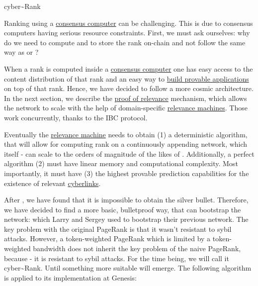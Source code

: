 \documentclass[8pt,oneside]{amsart}
\makeatletter
\newcommand{\linkred}[2]{\href{#1}{\color{red}{#2}}}
\newcommand{\linkgreen}[2]{\href{#1}{\color{green}{#2}}}
\renewcommand\subsection{\@startsection{subsection}
                                    {2}{\z@}
                                    {-3.25ex\@plus -1ex \@minus -.2ex}
                                    {0ex \@plus .2ex}
                                    {\play\Large}
                        }
\newcommand{\titleSection}[1]{\subsection{#1}}
\makeatother
\begin{document}
\titleSection{cyber\~{}Rank}\label{cyber-rank}

Ranking using a {\hyperref[consensus-computer]{consensus computer}} can be challenging. This is due to consensus computers having serious resource constraints. First, we must ask ourselves: why do we need to compute and to store the rank on-chain and not follow the same way as \linkgreen{https://ipfs.io/ipfs/QmZo7eY5UdJYotf3Z9GNVBGLjkCnE1j2fMdW2PgGCmvGPj}{Colony} or \linkgreen{https://ipfs.io/ipfs/QmTrxXp2xhB2zWGxhNoLgsztevqKLwpy5HwKjLjzFa7rnD}{Truebit}?

When a rank is computed inside a {\hyperref[consensus-computer]{consensus computer}} one has easy access to the content distribution of that rank and an easy way to {\hyperref[apps]{build provable applications}} on top of that rank. Hence, we have decided to follow a more cosmic architecture. In the next section, we describe the {\hyperref[proof-of-relevance]{proof of relevance}} mechanism, which allows the network to scale with the help of domain-specific {\hyperref[relevance-machine]{relevance machines}}. Those work concurrently, thanks to the IBC protocol.

Eventually the {\hyperref[relevance-machine]{relevance machine}} needs to obtain (1) a deterministic algorithm, that will allow for computing rank on a continuously appending network, which itself - can scale to the orders of magnitude of the likes of \linkred{https://google.com}{Google}. Additionally, a perfect algorithm (2) must have linear memory and computational complexity. Most importantly, it must have (3) the highest provable prediction capabilities for the existence of relevant {\hyperref[cyberlinks]{cyberlinks}}.

After \linkgreen{https://ipfs.io/ipfs/QmTJPJ55ePgR2MS1HoAtyqS1mteVLXUjAS4H8W97EEopxC}{some research}, we have found that it is impossible to obtain the silver bullet. Therefore, we have decided to find a more basic, bulletproof way, that can bootstrap the network: \linkgreen{http://ipfs.io/ipfs/QmbuE2Pfcsiji1g9kzmmsCnptqPEn3BuN3BhnZHrPVsiVw}{the rank} which Larry and Sergey used to bootstrap their previous network. The key problem with the original PageRank is that it wasn't resistant to sybil attacks. However, a token-weighted PageRank which is limited by a token-weighted bandwidth does not inherit the key problem of the naive PageRank, because - it is resistant to sybil attacks. For the time being, we will call it cyber\~{}Rank. Until something more suitable will emerge. The following algorithm is applied to its implementation at Genesis:
\end{document}
